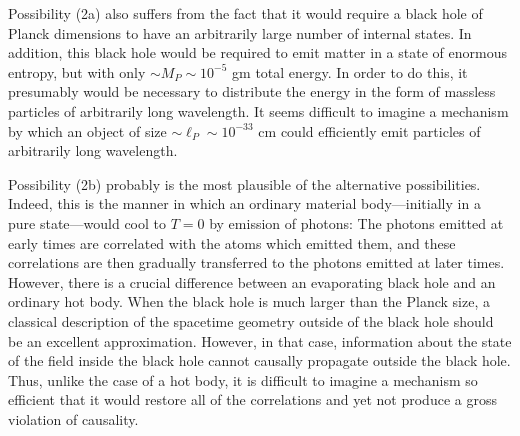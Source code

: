 \documentclass[11pt,a4paper]{article}
\begin{document}
Possibility (2a) also suffers from the fact that it would require a black hole of Planck dimensions to have an arbitrarily large number of internal states. In addition, this black hole would be required to emit matter in a state of enormous entropy, but with only \(\sim M_P\sim10^{-5}\) gm total energy. In order to do this, it presumably would be necessary to distribute the energy in the form of massless particles of arbitrarily long wavelength. It seems difficult to imagine a mechanism by which an object of size \(\sim\ell_P\sim10^{-33}\) cm could efficiently emit particles of arbitrarily long wavelength.

Possibility (2b) probably is the most plausible of the alternative possibilities. Indeed, this is the manner in which an ordinary material body---initially in a pure state---would cool to \(T=0\) by emission of photons: The photons emitted at early times are correlated with the atoms which emitted them, and these correlations are then gradually transferred to the photons emitted at later times. However, there is a crucial difference between an evaporating black hole and an ordinary hot body. When the black hole is much larger than the Planck size, a classical description of the spacetime geometry outside of the black hole should be an excellent approximation. However, in that case, information about the state of the field inside the black hole cannot causally propagate outside the black hole. Thus, unlike the case of a hot body, it is difficult to imagine a mechanism so efficient that it would restore all of the correlations and yet not produce a gross violation of causality.
\end{document}
